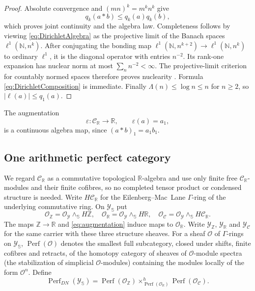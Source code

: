 \documentclass[11pt]{amsart}
\theoremstyle{definition}
\theoremstyle{remark}
\newcommand{\R}{\mathbb R}
\newcommand{\N}{\mathbb N}
\newcommand{\Z}{\mathbb Z}
\begin{document}
\begin{proof}
Absolute convergence and $(mn)^k=m^kn^k$ give
\[
 q_k(a*b)\leq q_k(a)q_k(b),
\]
which proves joint continuity and the algebra law.  Completeness follows by
viewing \eqref{eq:DirichletAlgebra} as the projective limit of the Banach
spaces $\ell^1(\N,n^k)$.  After conjugating the bonding map
$\ell^1(\N,n^{k+2})\to\ell^1(\N,n^k)$ to ordinary $\ell^1$, it is the
diagonal operator with entries $n^{-2}$.  Its rank-one expansion has nuclear
norm at most $\sum_nn^{-2}<\infty$.  The projective-limit criterion for
countably normed spaces therefore proves nuclearity
\cite[Chapter~4]{PietschNuclear}.  Formula
\eqref{eq:DirichletComposition} is immediate.  Finally
$\Lambda(n)\leq\log n\leq n$ for $n\geq2$, so
$|\ell(a)|\leq q_1(a)$.
\end{proof}

The augmentation
\begin{equation}\label{eq:augmentation}
 \varepsilon:\mathcal C_{\R}\longrightarrow\R,\qquad
 \varepsilon(a)=a_1,
\end{equation}
is a continuous algebra map, since $(a*b)_1=a_1b_1$.

\subsection{One arithmetic perfect category}

We regard $\mathcal C_{\R}$ as a commutative topological $\R$-algebra and
use only finite free $\mathcal C_{\R}$-modules and their finite cofibres, so
no completed tensor product or condensed structure is needed.  Write
$H\mathcal C_{\R}$ for the Eilenberg--Mac~Lane $\Gamma$-ring of the
underlying commutative ring.
On $\mathscr Y_{\mathbb S}$ put
\begin{equation}\label{eq:threeStructures}
 \mathcal O_{\Z}=\mathcal O_{\mathscr Y}\wedge_{\mathbb S}H\Z,
 \quad
 \mathcal O_{\R}=\mathcal O_{\mathscr Y}\wedge_{\mathbb S}H\R,
 \quad
 \mathcal O_{\mathcal C}=\mathcal O_{\mathscr Y}
        \wedge_{\mathbb S}H\mathcal C_{\R}.
\end{equation}
The maps $\Z\to\R$ and \eqref{eq:augmentation} induce maps to
$\mathcal O_{\R}$.  Write $\mathscr Y_{\Z}$,
$\mathscr Y_{\R}$ and $\mathscr Y_{\mathcal C}$ for the same carrier with
these three structure sheaves.  For a sheaf $\mathcal O$ of $\Gamma$-rings
on $\mathscr Y_{\mathbb S}$, $\operatorname{Perf}(\mathcal O)$ denotes the
smallest full subcategory, closed under shifts, finite cofibres and retracts,
of the homotopy category of sheaves of $\mathcal O$-module spectra (the
stabilization of simplicial $\mathcal O$-modules) containing the modules
locally of the form $\mathcal O^{n}$.  Define
\begin{equation}\label{eq:PerfDN}
 \operatorname{Perf}_{DN}(\mathscr Y_{\mathbb S})=
 \operatorname{Perf}(\mathcal O_{\Z})
 \times^h_{\operatorname{Perf}(\mathcal O_{\R})}
 \operatorname{Perf}(\mathcal O_{\mathcal C}).
\end{equation}
\end{document}
